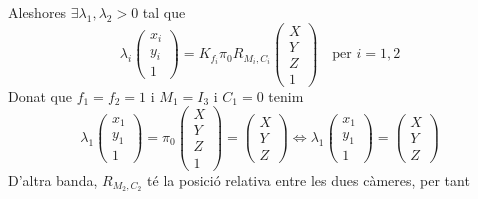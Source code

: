 \documentclass[../main.tex]{subfiles}
\begin{document}
\begin{enumerate}
		Aleshores $\exists \lambda_1, \lambda_2 > 0$ tal que
		\begin{displaymath}
			\lambda_i \begin{pmatrix}x_i\\y_i\\1\end{pmatrix} = K_{f_i} \pi_0 R_{M_i, C_i} \begin{pmatrix}X\\Y\\Z\\1\end{pmatrix} \quad \text{per } i = 1, 2
		\end{displaymath}
		Donat que $f_1 = f_2 = 1$ i $M_1 = I_3$ i $C_1 = 0$ tenim
		\begin{displaymath}
			\lambda_1 \begin{pmatrix}x_1\\y_1\\1\end{pmatrix} = \pi_0 \begin{pmatrix}X\\Y\\Z\\1\end{pmatrix} = \begin{pmatrix}X\\Y\\Z\end{pmatrix} \iff \lambda_1 \begin{pmatrix}x_1\\y_1\\1\end{pmatrix} = \begin{pmatrix}X\\Y\\Z\end{pmatrix}
		\end{displaymath}
		D'altra banda, $R_{M_2, C_2}$ té la posició relativa entre les dues càmeres, per tant
		\begin{displaymath}

\end{displaymath}
\end{enumerate}
\end{document}

